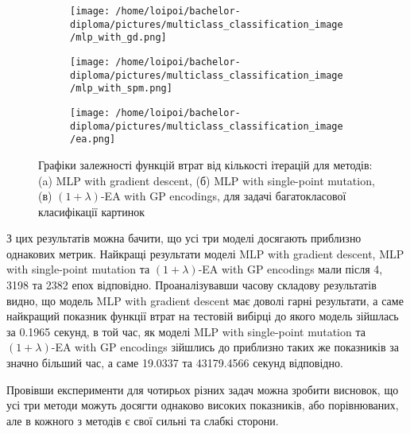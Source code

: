 \begin{figure}[ht]
	\centering
	\begin{subfigure}[b]{0.32\textwidth}    
		\texttt{[image: /home/loipoi/bachelor-diploma/pictures/multiclass\_classification\_image/mlp\_with\_gd.png]}
		\caption{}
	\end{subfigure}	
	\begin{subfigure}[b]{0.32\textwidth}
		\texttt{[image: /home/loipoi/bachelor-diploma/pictures/multiclass\_classification\_image/mlp\_with\_spm.png]}
		\caption{}
	\end{subfigure}	
	\begin{subfigure}[b]{0.32\textwidth}
		\texttt{[image: /home/loipoi/bachelor-diploma/pictures/multiclass\_classification\_image/ea.png]}
		\caption{}
	\end{subfigure}
	
	\caption{Графіки залежності функцій втрат від кількості ітерацій для методів: (a) MLP with gradient descent, (б) MLP with single-point mutation, (в) $(1+\lambda)$-EA with GP encodings, для задачі багатокласової класифікації картинок}
	\label{fig_losses_mc_id}
\end{figure}

З цих результатів можна бачити, що усі три моделі досягають приблизно однакових метрик. Найкращі результати моделі MLP with gradient descent, MLP with single-point mutation та $(1+\lambda)$-EA with GP encodings мали після 4, 3198 та 2382 епох відповідно. Проаналізувавши часову складову результатів видно, що модель MLP with gradient descent має доволі гарні результати, а саме найкращий показник функції втрат на тестовій вибірці до якого модель зійшлась за 0.1965 секунд, в той час, як моделі MLP with single-point mutation та $(1+\lambda)$-EA with GP encodings зійшлись до приблизно таких же показників за значно більший час, а саме 19.0337 та 43179.4566 секунд відповідно.

Провівши експерименти для чотирьох різних задач можна зробити висновок, що усі три методи можуть досягти однаково високих показників, або порівнюваних, але в кожного з методів є свої сильні та слабкі сторони. 

